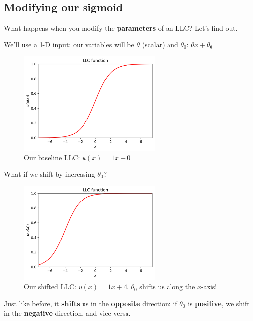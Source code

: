 
    \subsection*{Modifying our sigmoid}
    
        What happens when you modify the \textbf{parameters} of an LLC? Let's find out.
        
        We'll use a 1-D input: our variables will be $\theta$ (scalar) and $\theta_0$: $\theta x + \theta_0$
        
        \begin{figure}[H]
            \centering
            \includegraphics[width=70mm,scale=0.5]{images/classification_images/llc_func.png}
            \caption*{Our baseline LLC: $u(x)=1x+0 $}
        \end{figure}
        
        What if we shift by increasing $\theta_0$?
        
        \begin{figure}[H]
            \centering
            \includegraphics[width=70mm,scale=0.5]{images/classification_images/theta_0_+2.png}
            \caption*{Our shifted LLC: $u(x)=1x+4 $. $\theta_0$ shifts us along the $x$-axis!}
        \end{figure}
        
         Just like before, it \textbf{shifts} us in the \textbf{opposite} direction: if $\theta_0$ is \textbf{positive}, we shift in the \textbf{negative} direction, and vice versa.
         

